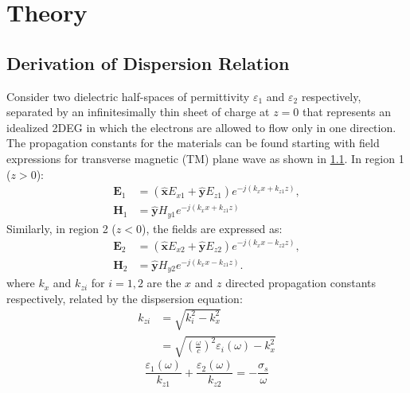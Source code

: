 \documentclass[conference, 10pt]{IEEEtran}
\renewcommand{\v}[1]{\mathbf{#1}} %
\renewcommand{\O}{\omega}  %
\newcommand{\E}{\varepsilon}  %
\renewcommand{\^}{\hat}  %
\begin{document}
\section{Theory}

\subsection{Derivation of Dispersion Relation}
%
Consider two dielectric half-spaces of permittivity $\E_1$ and $\E_2$ respectively, separated by an infinitesimally thin sheet of charge at $z = 0$ that represents an idealized 2DEG in which the electrons are allowed to flow only in one direction. The propagation constants for the materials can be found starting with field expressions for transverse magnetic (TM) plane wave as shown in \ref{}. In region 1 ($z > 0$):
%
\begin{subequations}
  \begin{align}
    \v E_1 &=  \left(\v{\^{x}} E_{x1} + \v{\^{y}} E_{z1} \right) e^{-j (k_x x + k_{z1}z)},
    \label{eq:E_1}\\
    \v H_1 &=  \v{\^{y}} H_{y1} e^{-j (k_x x + k_{z1}z)}
    \label{eq:H_1}
  \end{align}
  \label{eq:r_1}
\end{subequations}
%
Similarly, in region 2 ($z < 0$), the fields are expressed as:
%
\begin{subequations}
  \begin{align}
    \v E_2 &=  \left(\v{\^{x}} E_{x2} + \v{\^{y}} E_{z2} \right) e^{-j (k_x x - k_{z2}z)},
    \label{eq:E_2}\\
    \v H_2 &=  \v{\^{y}} H_{y2} e^{-j (k_x x - k_{z1}z)}.
    \label{eq:H_2}
  \end{align}
  \label{eq:r_2}
\end{subequations}
%
where $k_x$ and $k_{zi}$ for $i = 1,2$ are the $x$ and $z$ directed propagation constants respectively, related by the dispsersion equation:
%
\begin{equation}
  \begin{split}
    k_{zi} & = \sqrt{k_i^2 - k_x^2} \\
    & = \sqrt{\left(\frac{\O}{c}\right)^2 \E_i(\O) -  k_x^2}
  \end{split}
  \label{eq:kz}
\end{equation}
%
\begin{equation}
  \frac{\E_1(\O)}{k_{z1}} + \frac{\E_2(\O)}{k_{z2}} = -\frac{\sigma_s}{\O}
  \label{eq:disp_bas}
\end{equation}
\end{document}
